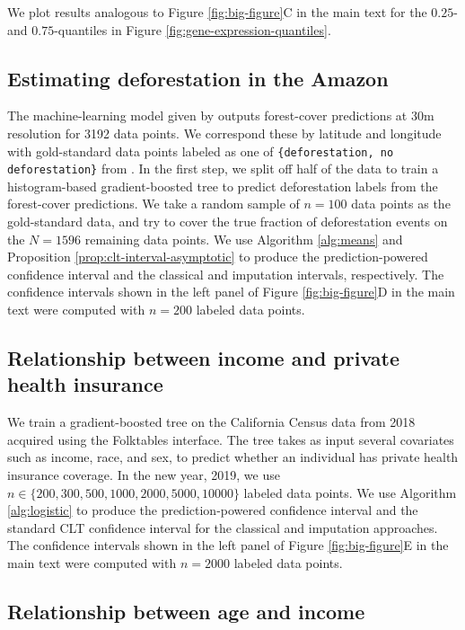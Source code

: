 \documentclass[10pt]{article}
\begin{document}
 
We plot results analogous to Figure \ref{fig:big-figure}C in the main text for the $0.25$- and $0.75$-quantiles in Figure \ref{fig:gene-expression-quantiles}.

\subsection{Estimating deforestation in the Amazon}
\label{app:forest}


The machine-learning model given by \cite{sexton2013global} outputs forest-cover predictions at 30m resolution for 3192 data points.
We correspond these by latitude and longitude with gold-standard data points labeled as one of \texttt{\{deforestation, no deforestation\}} from \cite{bullock2020satellite}.
In the first step, we split off half of the data to train a histogram-based gradient-boosted tree to predict deforestation labels from the forest-cover predictions.
We take a random sample of $n=100$ data points as the gold-standard data, and try to cover the true fraction of deforestation events on the $N=1596$ remaining data points.
We use Algorithm \ref{alg:means} and Proposition \ref{prop:clt-interval-asymptotic} to produce the prediction-powered confidence interval and the classical and imputation intervals, respectively.  The confidence intervals shown in the left panel of Figure \ref{fig:big-figure}D in the main text were computed with $n = 200$ labeled data points.

\subsection{Relationship between income and private health insurance}


We train a gradient-boosted tree \cite{chen2016xgboost} on the California Census data from 2018 acquired using the Folktables \cite{ding2021retiring} interface.
The tree takes as input several covariates such as income, race, and sex, to predict whether an individual has private health insurance coverage.
In the new year, 2019, we use $n\in\{200, 300, 500, 1000, 2000, 5000, 10000\}$ labeled data points. We use Algorithm \ref{alg:logistic} to produce the prediction-powered confidence interval and the standard CLT confidence interval for the classical and imputation approaches. The confidence intervals shown in the left panel of Figure \ref{fig:big-figure}E in the main text were computed with $n = 2000$ labeled data points.


\subsection{Relationship between age and income}
\end{document}
